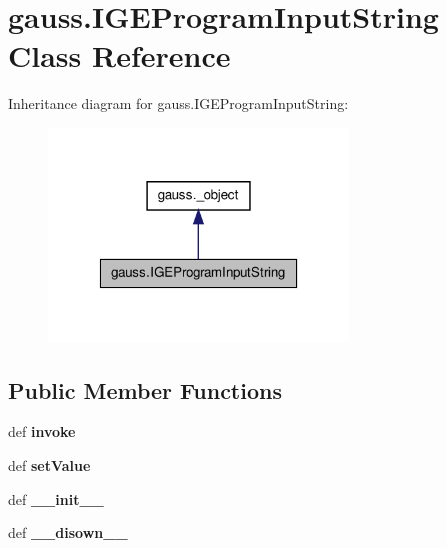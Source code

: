 \hypertarget{classgauss_1_1_i_g_e_program_input_string}{\section{gauss.\-I\-G\-E\-Program\-Input\-String Class Reference}
\label{classgauss_1_1_i_g_e_program_input_string}
}


Inheritance diagram for gauss.\-I\-G\-E\-Program\-Input\-String\-:\nopagebreak
\begin{figure}[H]
\begin{center}
\leavevmode
\includegraphics[width=226pt]{classgauss_1_1_i_g_e_program_input_string__inherit__graph}
\end{center}
\end{figure}
\subsection*{Public Member Functions}
\begin{DoxyCompactItemize}
\item 
\hypertarget{classgauss_1_1_i_g_e_program_input_string_ace7cd6c17f3d12dd372c6e1f6ff7ba91}{def {\bfseries invoke}}\label{classgauss_1_1_i_g_e_program_input_string_ace7cd6c17f3d12dd372c6e1f6ff7ba91}

\item 
\hypertarget{classgauss_1_1_i_g_e_program_input_string_af581f0694ab56f5023e5202c4a1b5267}{def {\bfseries set\-Value}}\label{classgauss_1_1_i_g_e_program_input_string_af581f0694ab56f5023e5202c4a1b5267}

\item 
\hypertarget{classgauss_1_1_i_g_e_program_input_string_a71cd3726608b6c8a8feb3c46de3d099b}{def {\bfseries \-\_\-\-\_\-init\-\_\-\-\_\-}}\label{classgauss_1_1_i_g_e_program_input_string_a71cd3726608b6c8a8feb3c46de3d099b}

\item 
\hypertarget{classgauss_1_1_i_g_e_program_input_string_a8a1e713a5fd3f63c1b8f5d4a760fd6e4}{def {\bfseries \-\_\-\-\_\-disown\-\_\-\-\_\-}}\label{classgauss_1_1_i_g_e_program_input_string_a8a1e713a5fd3f63c1b8f5d4a760fd6e4}

\end{DoxyCompactItemize}
